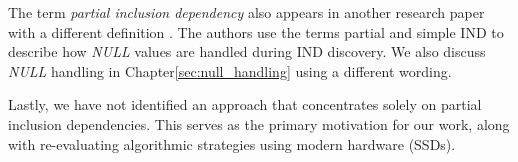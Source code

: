 The term \textit{partial inclusion dependency} also appears in another research paper with a different definition \cite{kohler2015inclusion}. The authors use the terms partial and simple IND to describe how \textit{NULL} values are handled during IND discovery. We also discuss \textit{NULL} handling in Chapter\ref{sec:null_handling} using a different wording.

Lastly, we have not identified an approach that concentrates solely on partial inclusion dependencies. This serves as the primary motivation for our work, along with re-evaluating algorithmic strategies using modern hardware (SSDs).

